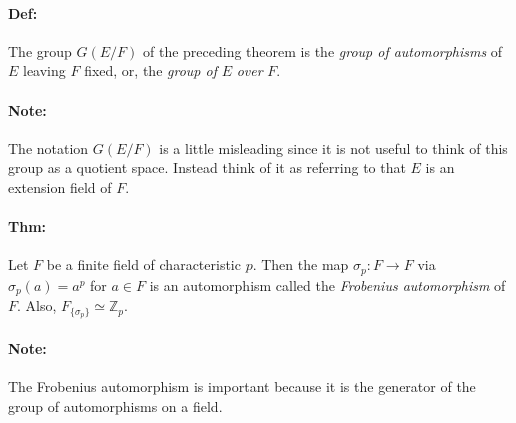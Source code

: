\documentclass[10pt,a4paper]{article}
\begin{document}
\paragraph{Def:} The group $G(E/F)$ of the preceding theorem is the \textit{group of automorphisms} of $E$ leaving $F$ fixed, or, the \textit{group of} $E$ \textit{over} $F$.

\paragraph{Note:} The notation $G(E/F)$ is a little misleading since it is not useful to think of this group as a quotient space. Instead think of it as referring to that $E$ is an extension field of $F$.

\paragraph{Thm:}  Let $F$ be a finite field of characteristic $p$. Then the map $\sigma_p:F \to F$ via $\sigma_p(a) = a^p$ for $a \in F$ is an automorphism called the \textit{Frobenius automorphism} of $F$. Also, $F_{\{\sigma_p\}} \simeq \mathbb{Z}_p$.

\paragraph{Note:} The Frobenius automorphism is important because it is the generator of the group of automorphisms on a field.
\end{document}
